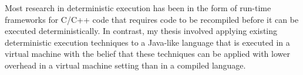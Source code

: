 Most research in deterministic execution has been in the form of
run-time frameworks for C/C++ code that requires code to be recompiled
before it can be executed deterministically.  In contrast, my thesis
involved applying existing deterministic execution techniques to a
Java-like language that is executed in a virtual machine with the
belief that these techniques can be applied with lower overhead in a
virtual machine setting than in a compiled language.


